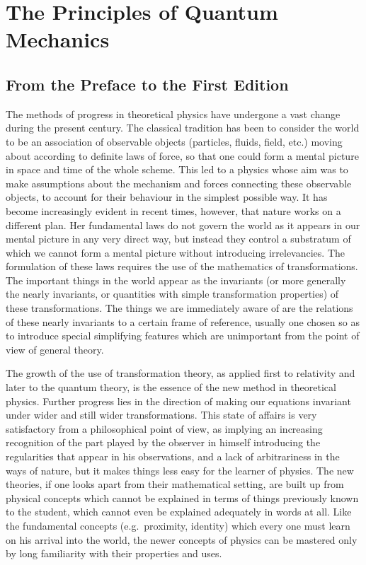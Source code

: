 \chapter{The Principles of Quantum Mechanics}



\section*{From the Preface to the First Edition}

The methods of progress in theoretical physics have undergone a vast change during the present century.  The classical tradition has been to consider the world to be an association of observable objects (particles, fluids, field, etc.) moving about according to definite laws of force, so that one could form a mental picture in space and time of the whole scheme.  This led to a physics whose aim was to make assumptions about the mechanism and forces connecting these observable objects, to account for their behaviour in the simplest possible way. It has become increasingly evident in recent times, however, that nature works on a different plan. Her fundamental laws do not govern the world as it appears in our mental picture in any very direct way, but instead they control a substratum of which we cannot form a mental picture without introducing irrelevancies.  The formulation of these laws requires the use of the mathematics of transformations.  The important things in the world appear as the invariants (or more generally the nearly invariants, or quantities with simple transformation properties) of these transformations. The things we are immediately aware of are the relations of these nearly invariants to a certain frame of reference, usually one chosen so as to introduce special simplifying features which are unimportant from the point of view of general theory. 

The growth of the use of transformation theory, as applied first to relativity and later to the quantum theory, is the essence of the new method in theoretical physics.  Further progress lies in the direction of making our equations invariant under wider and still wider transformations.  This state of affairs is very satisfactory from a philosophical point of view, as implying an increasing recognition of the part played by the observer in himself introducing the regularities that appear in his observations, and a lack of arbitrariness in the ways of nature, but it makes things less easy for the learner of physics.  The new theories, if one looks apart from their mathematical setting, are built up from physical concepts which cannot be explained in terms of things previously known to the student, which cannot even be explained adequately in words at all.  Like the fundamental concepts (e.g.\ proximity, identity) which every one must learn on his arrival into the world, the newer concepts of physics can be mastered only by long familiarity with their properties and uses.

